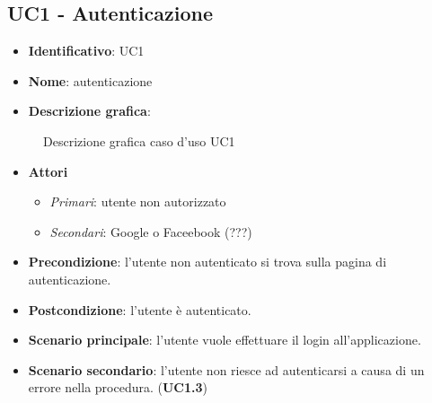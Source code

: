 
\subsection{UC1 - Autenticazione}
\begin{itemize}
  \item \textbf{Identificativo}: UC1
  \item \textbf{Nome}: autenticazione
  \item \textbf{Descrizione grafica}:
\end{itemize}

\begin{figure}[h]
  \centering
  \caption{Descrizione grafica caso d'uso UC1}
\end{figure}

\begin{itemize}
  \item \textbf{Attori}
        \begin{itemize}
          \item \textit{Primari}: utente non autorizzato
          \item \textit{Secondari}: Google o Faceebook (???)
        \end{itemize}
  \item \textbf{Precondizione}: l'utente non autenticato si trova sulla pagina di autenticazione.
  \item \textbf{Postcondizione}: l'utente è autenticato.
  \item \textbf{Scenario principale}: l'utente vuole effettuare il login all'applicazione.
  \item \textbf{Scenario secondario}: l'utente non riesce ad autenticarsi a causa di un errore nella procedura. (\textbf{UC1.3})
\end{itemize}
\newpage

